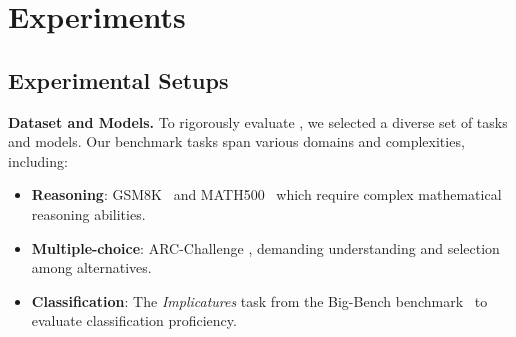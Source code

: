 \section{Experiments}



\subsection{Experimental Setups}

\textbf{Dataset and Models.}
To rigorously evaluate \sysname{}, we selected a diverse set of tasks and models. Our benchmark tasks span various domains and complexities, including: 
\begin{itemize}[itemsep=-4pt, topsep=0pt]
    \item \textbf{Reasoning}: GSM8K~\citep{gsm8k} and MATH500~\citep{math,lightman2023let} which require complex mathematical reasoning abilities.
    \item \textbf{Multiple-choice}: ARC-Challenge \citep{clark2018thinksolvedquestionanswering}, demanding understanding and selection among alternatives.
    \item \textbf{Classification}: The \textit{Implicatures} task from the Big-Bench benchmark~\citep{srivastava2023beyond} to evaluate classification proficiency.
\end{itemize}
